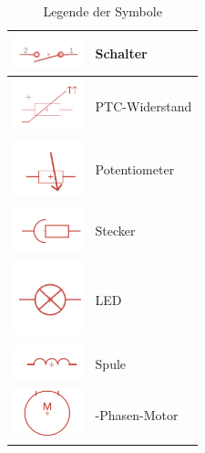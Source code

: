 \begin{table}[ht]
{\begin{tabular}{|m{5cm}|m{7cm}|}
			\hline
			\centering\includegraphics[width=2cm]{Legende/Schalter.png} & \centering Schalter \tabularnewline
			\hline
			\centering\includegraphics[width=2cm]{Legende/PTC-Widerstand.png} & \centering PTC-Widerstand \tabularnewline
			\hline
			\centering\includegraphics[width=2cm]{Legende/Potentiometer.png} & \centering Potentiometer \tabularnewline
			\hline
			\centering\includegraphics[width=2cm]{Legende/Stecker.png} & \centering Stecker \tabularnewline
			\hline
			\centering\includegraphics[width=2cm]{Legende/LED.png} & \centering LED \tabularnewline
			\hline
			\centering\includegraphics[width=2cm]{Legende/Spule.png} & \centering Spule \tabularnewline
			\hline
			\centering\includegraphics[width=2cm]{Legende/3 Phasen Motor.png} & \centering 3-Phasen-Motor \tabularnewline
			\hline
	\end{tabular}}
	\caption{Legende der Symbole}
	\label{tab:legende}
\end{table}